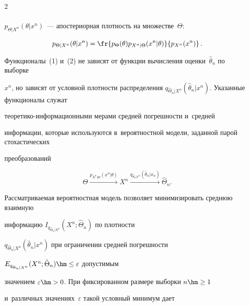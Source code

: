 \begin{multicols}{2}
\begin{align*}
\end{align*}


 $p_{\Theta\vert X^n}(\theta\vert x^n)$~--- апостериорная плот\-ность на множестве~$\Theta$:


$$


p_{\Theta\vert X^n}(\theta\vert x^n) =\fr{p_\Theta(\theta) p_{X^n\vert \Theta}(x^n\vert 


\theta)}{p_{X^n}(x^n)} \,.


$$








Функционалы~(1) и~(2) не зависят от функции вычисления оценки~$\hat{\theta}_n$ по выборке 


$x^n$, но зависят от условной плот\-ности распределения $q_{\hat{\Theta}_n\vert X^n} 


(\hat{\theta}_n\vert x^n)$. Указанные функционалы служат  


тео\-ре\-ти\-ко-ин\-фор\-ма\-ци\-он\-ны\-ми мерами средней погрешности и~средней 


информации, которые используются в~вероятностной модели, заданной парой стохастических 


преобразований 


\begin{equation*}


\Theta \xrightarrow{p_{X^n\vert\Theta}(x^n\vert \theta)}


 X^n 


 \xrightarrow{q_{\hat{\theta}_n\vert x^n} (\hat{\theta}_n\vert x_n)} \hat{\Theta}_n.


\end{equation*}





Рассматриваемая вероятностная модель позволяет минимизировать сред\-нюю взаимную 


информацию $I_{q_{\hat{\Theta}_n\vert X^n}} (X^n;\hat{\Theta}_n)$ по плот\-ности 


$q_{\hat{\Theta}_n\vert X^n}(\hat{\theta}_n\vert x^n)$ при ограничении средней по\-греш\-ности 


$E_{q_{\hat{\Theta}_n\vert X^n}}(X^n;\hat{\Theta}_n)\hm\leq \varepsilon$ допустимым 


значением $\varepsilon\hm> 0$. При фиксированном размере выборки $n\hm\geq 1$ 


и~различных значениях~$\varepsilon$ такой условный минимум дает 



\end{multicols}
